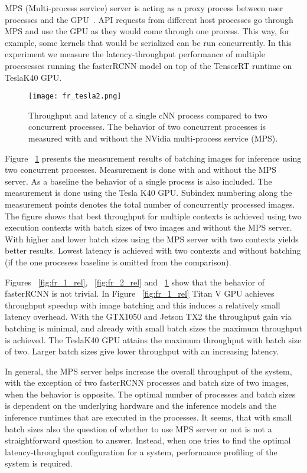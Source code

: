 \documentclass[sigconf]{acmart}
\begin{document}
MPS (Multi-process service) server is acting as a proxy process between user processes and the GPU~\cite{mps}. API requests from different host processes go through MPS and use the GPU as they would come through one process. This way, for example, some kernels that would be serialized can be run concurrently. In this experiment we measure the latency-throughput performance of multiple procesesses running the fasterRCNN model on top of the TensorRT runtime on TeslaK40 GPU.

\begin{figure}[t]
\centering
\texttt{[image: fr\_tesla2.png]}
\caption{Throughput and latency of a single cNN process compared to two concurrent processes. The behavior of two concurrent processes is measured with and without the NVidia multi-process service (MPS).}
\label{fig:fr_tesla}
\end{figure}

Figure ~\ref{fig:fr_tesla} presents the measurement results of batching images for inference using two concurrent processes. Measurement is done with and without the MPS server. As a baseline the behavior of a single process is also included. The measurement is done using the Tesla K40 GPU. Subindex numbering along the measurement points denotes the total number of concurrently processed images. The figure shows that best throughput for multiple contexts is achieved using two execution contexts with batch sizes of two images and without the MPS server. With higher and lower batch sizes using the MPS server with two contexts yields better results. Lowest latency is achieved with two contexts and without batching (if the one procesess baseline is omitted from the comparison).

Figures ~\ref{fig:fr_1_rel}, ~\ref{fig:fr_2_rel} and ~\ref{fig:fr_tesla} show that the behavior of fasterRCNN is not trivial. In Figure ~\ref{fig:fr_1_rel} Titan V GPU achieves throughput speedup with image batching and this induces a relatively small latency overhead. With the GTX1050 and Jetson TX2 the throughput gain via batching is minimal, and already with small batch sizes the maximum throughput is achieved. The TeslaK40 GPU attains the maximum throughput with batch size of two. Larger batch sizes give lower throughput with an increasing latency.

In general, the MPS server helps increase the overall throughput of the system, with the exception of two fasterRCNN processes and batch size of two images, when the behavior is opposite. The optimal number of processes and batch sizes is dependent on the underlying hardware and the inference models and the inference runtimes that are executed in the processes. It seems, that with small batch sizes also the question of whether to use MPS server or not is not a straightforward question to answer. Instead, when one tries to find the optimal latency-throughput configuration for a system, performance profiling of the system is required.
\end{document}
